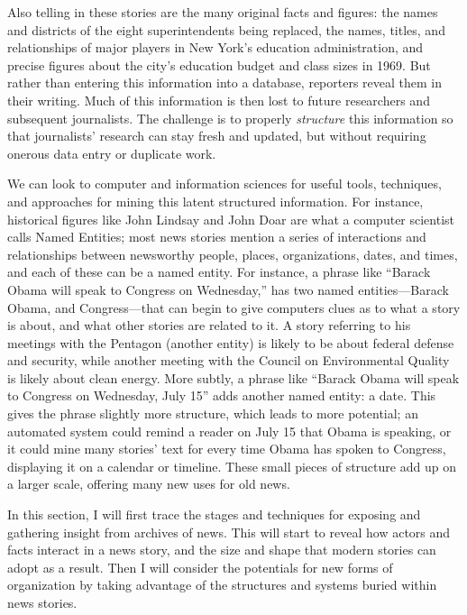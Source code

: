 Also telling in these stories are the many original facts and figures: the names and districts of the eight superintendents being replaced, the names, titles, and relationships of major players in New York's education administration, and precise figures about the city's education budget and class sizes in 1969. But rather than entering this information into a database, reporters reveal them in their writing. Much of this information is then lost to future researchers and subsequent journalists. The challenge is to properly \emph{structure} this information so that journalists' research can stay fresh and updated, but without requiring onerous data entry or duplicate work.

We can look to computer and information sciences for useful tools, techniques, and approaches for mining this latent structured information. For instance, historical figures like John Lindsay and John Doar are what a computer scientist calls Named Entities; most news stories mention a series of interactions and relationships between newsworthy people, places, organizations, dates, and times, and each of these can be a named entity. For instance, a phrase like ``Barack Obama will speak to Congress on Wednesday,'' has two named entities---Barack Obama, and Congress---that can begin to give computers clues as to what a story is about, and what other stories are related to it. A story referring to his meetings with the Pentagon (another entity) is likely to be about federal defense and security, while another meeting with the Council on Environmental Quality is likely about clean energy. More subtly, a phrase like ``Barack Obama will speak to Congress on Wednesday, July 15'' adds another named entity: a date. This gives the phrase slightly more structure, which leads to more potential; an automated system could remind a reader on July 15 that Obama is speaking, or it could mine many stories' text for every time Obama has spoken to Congress, displaying it on a calendar or timeline. These small pieces of structure add up on a larger scale, offering many new uses for old news.


In this section, I will first trace the stages and techniques for exposing and gathering insight from archives of news. This will start to reveal how actors and facts interact in a news story, and the size and shape that modern stories can adopt as a result. Then I will consider the potentials for new forms of organization by taking advantage of the structures and systems buried within news stories.

